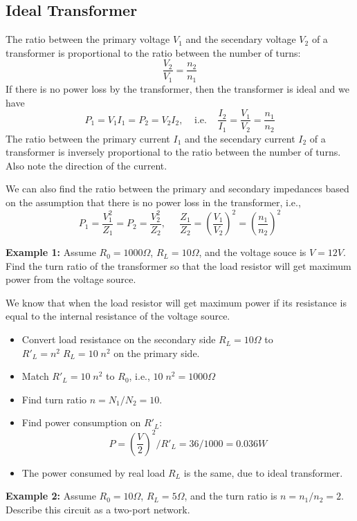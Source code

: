 \subsection*{Ideal Transformer}


The ratio between the primary voltage $V_1$ and the secendary voltage $V_2$ of 
a transformer is proportional to the ratio between the number of turns:
\[	\frac{V_2}{V_1}=\frac{n_2}{n_1}	\]
If there is no power loss by the transformer, then the transformer is ideal and
we have
\[P_1=V_1I_1=P_2=V_2I_2,\;\;\;\;\mbox{i.e.}\;\;\;\;
	\frac{I_2}{I_1}=\frac{V_1}{V_2}=\frac{n_1}{n_2}	\]
The ratio between the primary current $I_1$ and the secendary current $I_2$ of 
a transformer is inversely proportional to the ratio between the number of turns.
Also note the direction of the current.

We can also find the ratio between the primary and secondary impedances based on 
the assumption that there is no power loss in the transformer, i.e.,
\[	P_1=\frac{V_1^2}{Z_1}=P_2=\frac{V_2^2}{Z_2}, \;\;\;\;\;
	\frac{Z_1}{Z_2}=(\frac{V_1}{V_2})^2=(\frac{n_1}{n_2})^2  \]

{\bf Example 1:} Assume $R_0=1000\Omega$, $R_L=10\Omega$, and the voltage souce is
$V=12V$. Find the turn ratio of the transformer so that the load resistor will get 
maximum power from the voltage source.


We know that when the load resistor will get maximum power if its resistance is 
equal to the internal resistance of the voltage source. 
\begin{itemize}
\item Convert load resistance on the secondary side $R_L=10\Omega$ to 
	$R'_L=n^2\; R_L=10\; n^2$ on the primary side.
\item Match $R'_L=10\;n^2$ to $R_0$, i.e., $10\; n^2=1000\Omega$
\item Find turn ratio $n=N_1/N_2=10$.
\item Find power consumption on $R'_L$: 
	\[ P=(\frac{V}{2})^2/R'_L=36/1000=0.036W	\]
\item The power consumed by real load $R_L$ is the same, due to ideal transformer.
\end{itemize}

{\bf Example 2:} Assume $R_0=10\Omega$, $R_L=5\Omega$, and the turn ratio is
$n=n_1/n_2=2$. Describe this circuit as a two-port network.

